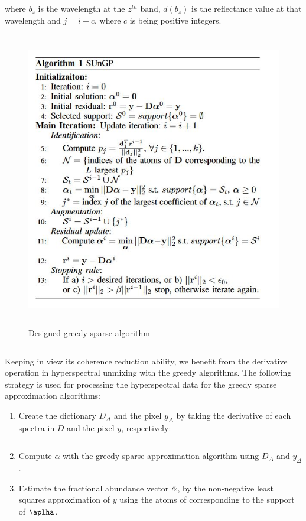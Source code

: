 \documentclass[12pt]{svproc}
\begin{document}
where $b_{z}$ is the wavelength at the $z^{th}$ band, $ d(b_{z})$ is the reflectance value at that wavelength and $j=i+c$, where $c$ is being positive integers.\\

\begin{figure}[h]
	\centering
	\includegraphics[width=0.8\linewidth, height=13cm]{Picture8} 
	\caption{Designed greedy sparse algorithm }
	\label{fig:algo}
\end{figure}

\hline
\inputminted{octave}{SUnGP.m}
\hline
\vspace{1cm}
Keeping in view its coherence reduction ability, we benefit
from  the  derivative  operation  in  hyperspectral  unmixing  with
the greedy algorithms. The following strategy is used for processing the hyperspectral data for the greedy sparse approximation algorithms:

\begin{enumerate}
    \item Create the dictionary $D_{\Delta}$ and the pixel $y_\Delta$ by taking
the  derivative  of  each  spectra  in $D$ and  the  pixel $y$, respectively:\\
\hline
\inputminted{octave}{SpecDerivative.m}
\hline
\vspace{5mm}
    \item Compute $\alpha$ with  the  greedy  sparse  approximation algorithm using $D_{\Delta}$ and $y_\Delta$.
    \item Estimate  the  fractional  abundance  vector $\Bar{\alpha}$,  by  the non-negative least squares approximation of $y$ using the atoms of corresponding to the support of $\aplha$.\\
    \hline
    \inputminted{octave}{Sugnp_code.m}
    \hline
\end{enumerate}
 
\end{document}
